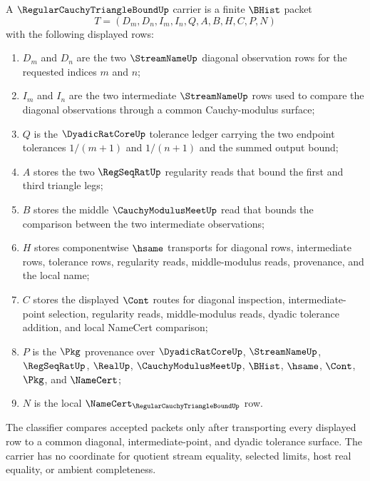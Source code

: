\begin{definition}
\label{def:regular-cauchy-triangle-bound-carrier}
A $\RegularCauchyTriangleBoundUp$ carrier is a finite $\BHist$ packet
$$
T=(D_m,D_n,I_m,I_n,Q,A,B,H,C,P,N)
$$
with the following displayed rows:
\begin{enumerate}
\item $D_m$ and $D_n$ are the two $\StreamNameUp$ diagonal observation rows for the requested indices $m$ and $n$;
\item $I_m$ and $I_n$ are the two intermediate $\StreamNameUp$ rows used to compare the diagonal observations through a common Cauchy-modulus surface;
\item $Q$ is the $\DyadicRatCoreUp$ tolerance ledger carrying the two endpoint tolerances $1/(m+1)$ and $1/(n+1)$ and the summed output bound;
\item $A$ stores the two $\RegSeqRatUp$ regularity reads that bound the first and third triangle legs;
\item $B$ stores the middle $\CauchyModulusMeetUp$ read that bounds the comparison between the two intermediate observations;
\item $H$ stores componentwise $\hsame$ transports for diagonal rows, intermediate rows, tolerance rows, regularity reads, middle-modulus reads, provenance, and the local name;
\item $C$ stores the displayed $\Cont$ routes for diagonal inspection, intermediate-point selection, regularity reads, middle-modulus reads, dyadic tolerance addition, and local NameCert comparison;
\item $P$ is the $\Pkg$ provenance over $\DyadicRatCoreUp$, $\StreamNameUp$, $\RegSeqRatUp$, $\RealUp$, $\CauchyModulusMeetUp$, $\BHist$, $\hsame$, $\Cont$, $\Pkg$, and $\NameCert$;
\item $N$ is the local $\NameCert_{\RegularCauchyTriangleBoundUp}$ row.
\end{enumerate}
The classifier compares accepted packets only after transporting every displayed row to a common diagonal, intermediate-point, and dyadic tolerance surface. The carrier has no coordinate for quotient stream equality, selected limits, host real equality, or ambient completeness.
\end{definition}

